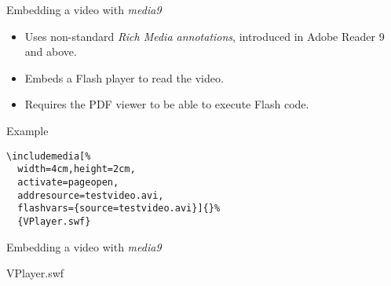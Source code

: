 \documentclass{beamer}
\begin{document}
\begin{frame}[fragile]{Embedding a video with \emph{media9}}{}
  \begin{block}{}
    \begin{itemize}
      \item Uses non-standard \emph{Rich Media annotations},
            introduced in Adobe Reader 9 and above.
      \item Embeds a Flash player to read the video.
      \item Requires the PDF viewer to be able to execute
            Flash code.
    \end{itemize}
  \end{block}

  \begin{block}{Example}
    \begin{verbatim}
\includemedia[%
  width=4cm,height=2cm,
  activate=pageopen,
  addresource=testvideo.avi,
  flashvars={source=testvideo.avi}]{}%
  {VPlayer.swf}
    \end{verbatim}
  \end{block}
\end{frame}

\begin{frame}{Embedding a video with \emph{media9}}{}
  \begin{block}{}
    \begin{center}
        {VPlayer.swf}
    \end{center}
  \end{block}
\end{frame}
\end{document}
